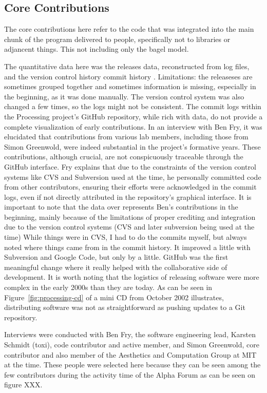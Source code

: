 \subsection{Core Contributions}
The core contributions here refer to the code that was integrated into the main chunk of the program delivered to people, specifically not to libraries or adjancent things. This not including only the bagel model.

The quantitative data here was the releases data, reconstructed from log files, and the version control history commit history . Limitations: the releaseses are sometimes grouped together and sometimes information is missing, especially in the beginning, as it was done manually. The version control system was also changed a few times, so the logs might not be consistent. 
The commit logs within the Processing project's GitHub repository, while rich with data, do not provide a complete visualization of early contributions. In an interview with Ben Fry, it was elucidated that contributions from various lab members, including those from Simon Greenwold, were indeed substantial in the project's formative years. These contributions, although crucial, are not conspicuously traceable through the GitHub interface. Fry explains that due to the constraints of the version control systems like CVS and Subversion used at the time, he personally committed code from other contributors, ensuring their efforts were acknowledged in the commit logs, even if not directly attributed in the repository's graphical interface.
It is important to note that the data over represents Ben's contributions in the beginning, mainly because of the limitations of proper crediting and integration due to the version control systems (CVS and later subversion being used at the time)
While things were in CVS, I had to do the commits myself, but always noted where things came from in the commit history. It improved a little with Subversion and Google Code, but only by a little. GitHub was the first meaningful change where it really helped with the collaborative side of development. 
It is worth noting that the logistics of releasing software were more complex in the early 2000s than they are today. As can be seen in Figure~\ref{fig:processing-cd} of a mini CD from October 2002 illustrates, distributing software was not as straightforward as pushing updates to a Git repository.

Interviews were conducted with Ben Fry, the software engineering lead, Karsten Schmidt (toxi), code contributor and active member, and Simon Greenwold, core contributor and also member of the Aesthetics and Computation Group at MIT at the time. These people were selected here because they can be seen among the few contributors during the activity time of the Alpha Forum as can be seen on figure XXX. 

